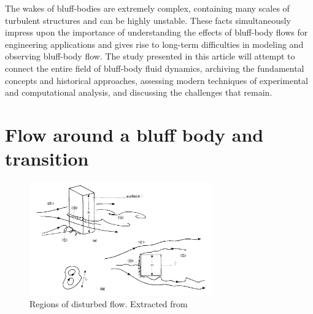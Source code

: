 \documentclass[journal]{new-aiaa}
\begin{document}
The wakes of bluff-bodies are extremely complex, containing many scales of turbulent structures and can be highly unstable. These facts simultaneously impress upon the importance of understanding the effects of bluff-body flows for engineering applications and gives rise to long-term difficulties in modeling and observing bluff-body flow. The study presented in this article will attempt to connect the entire field of bluff-body fluid dynamics, archiving the fundamental concepts and historical approaches, assessing modern techniques of experimental and computational analysis, and discussing the challenges that remain.










































\section{Flow around a bluff body and transition}

\begin{figure}[H]
\begin{center}
\includegraphics[width=0.7\textwidth]{Images/federico/Figure01}
\caption{ Regions of disturbed flow. Extracted from \cite{hunt1990} }
\label{fig:RegionsFlow}
\end{center}
\end{figure}
\end{document}
